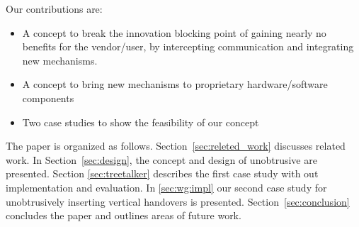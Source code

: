 

Our contributions are:

\begin{itemize}
 \item A concept to break the innovation blocking point of gaining nearly no benefits for the vendor/user, by intercepting communication and integrating new mechanisms.
 \item A concept to bring new mechanisms to proprietary hardware/software components
 \item Two case studies to show the feasibility of our concept 
\end{itemize}

The paper is organized as follows. 
Section~\ref{sec:releted_work} discusses related work.
In Section~\ref{sec:design}, the concept and design of unobtrusive \mm are presented.
Section \ref{sec:treetalker} describes the first case study with out \ttt implementation and evaluation. 
In \ref{sec:wg:impl} our second case study for unobtrusively inserting vertical handovers is presented. 
Section~\ref{sec:conclusion} concludes the paper and outlines areas of future work.
